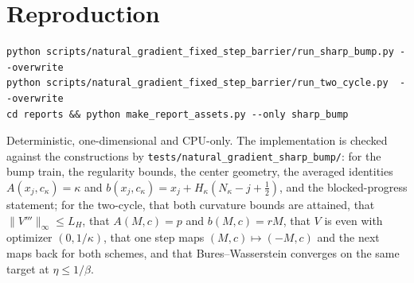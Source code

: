 \documentclass[11pt]{article}
\begin{document}
\section{Reproduction}
\label{sec:repro}

\begin{verbatim}
python scripts/natural_gradient_fixed_step_barrier/run_sharp_bump.py --overwrite
python scripts/natural_gradient_fixed_step_barrier/run_two_cycle.py  --overwrite
cd reports && python make_report_assets.py --only sharp_bump
\end{verbatim}

Deterministic, one-dimensional and CPU-only. The implementation is checked against
the constructions by \texttt{tests/natural\_gradient\_sharp\_bump/}: for the bump
train, the regularity bounds, the center geometry, the averaged identities
$A(x_j,c_\kappa)=\kappa$ and $b(x_j,c_\kappa)=x_j+H_\kappa(N_\kappa-j+\tfrac12)$, and
the blocked-progress statement; for the two-cycle, that both curvature bounds are
attained, that $\|V'''\|_\infty\le L_H$, that $A(M,c)=p$ and $b(M,c)=rM$, that $V$ is
even with optimizer $(0,1/\kappa)$, that one step maps $(M,c)\mapsto(-M,c)$ and the
next maps back for both schemes, and that Bures--Wasserstein converges on the same
target at $\eta\le1/\beta$.
\end{document}
